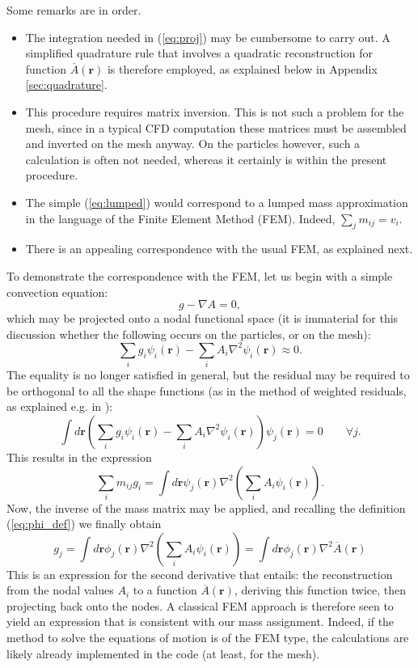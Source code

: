 \documentclass{ws-ijcm}
\newcommand{\bfr}{\mathbf{r}}
\newcommand*{\Ab}{\overline{A}}
\begin{document}
Some remarks are in order.

\begin{itemize}

\item The integration needed in (\ref{eq:proj}) may be cumbersome to
  carry out. A simplified quadrature rule that involves a quadratic
  reconstruction for function $\Ab(\bfr)$ is therefore employed, as
  explained below in Appendix \ref{sec:quadrature}.

\item This procedure requires matrix inversion. This is not such a
  problem for the mesh, since in a typical CFD computation these
  matrices must be assembled and inverted on the mesh anyway. On the
  particles however, such a calculation is often not needed, whereas
  it certainly is within the present procedure.

\item The simple (\ref{eq:lumped}) would correspond to a lumped mass
  approximation in the language of the Finite Element Method
  (FEM). Indeed, $\sum_j m_{ij}= v_i$.

\item There is an appealing correspondence with the usual FEM, as
  explained next.

\end{itemize}

To demonstrate the correspondence with the FEM, let us begin
with a simple convection equation:
\[
g - \nabla  A  = 0 ,
\]
which may be projected onto a nodal functional space (it is immaterial
for this discussion whether the following occurs on the particles, or
on the mesh):
\[
\sum_i g_i \psi_i(\bfr)  -  \sum_i A_ i \nabla^2 \psi_i(\bfr)  \approx 0.
\]
The equality is no longer satisfied in general, but the residual may
be required to be orthogonal to all the shape functions (as in the
method of weighted residuals, as explained e.g. in \cite{reddy}):
\[
\int d\bfr
\left(
\sum_i g_i \psi_i(\bfr)  -  \sum_i A_ i \nabla^2 \psi_i(\bfr) 
\right)
\psi_j(\bfr) =0 \qquad \forall j .
\]
This results in the expression
\[
\sum_i m_{ij} g_i =
  \int d\bfr  \psi_j(\bfr)   \nabla^2 
\left(
  \sum_i A_i \psi_i(\bfr) 
\right) .
\]
%
Now, the inverse of the mass matrix may be applied, and recalling the
definition (\ref{eq:phi_def}) we finally obtain
\[
 g_j =
 \int d\bfr  \phi_j(\bfr)   \nabla^2 
 \left(
   \sum_i A_i \psi_i(\bfr) 
 \right) = 
 \int d\bfr  \phi_j(\bfr)   \nabla^2 \Ab(\bfr)
\]
This is an expression for the second derivative that entails: the
reconstruction from the nodal values $A_i$ to a function $\Ab(\bfr)$,
deriving this function twice, then projecting back onto the nodes.  A
classical FEM approach is therefore seen to yield an expression that
is consistent with our mass assignment. Indeed, if the method to solve
the equations of motion is of the FEM type, the calculations are
likely already implemented in the code (at least, for the mesh).
\end{document}
